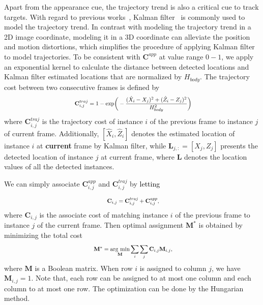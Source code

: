 \documentclass{article}
\newcommand{\argmin}{\mathop{\rm arg~min}\limits}
\newcommand{\YangProof}[1]{\textcolor{black}{#1}}
\begin{document}
Apart from the appearance cue, the trajectory trend is also a critical cue to track targets. With regard to previous works~\cite{yu2016poi, wojke2017simple}, Kalman filter~\cite{kalman1960new} is commonly used to model the trajectory trend. In contrast with modeling the trajectory trend in a 2D image coordinate, modeling it in a 3D coordinate can alleviate the position and motion distortions, which simplifies the procedure of applying Kalman filter to model trajectories. To be consistent with $\mathbf{C}^{app}$ at value range $0-1$, we apply an exponential kernel to calculate the distance between detected locations and Kalman filter estimated locations that are normalized by $H_{body}$. The trajectory cost between two consecutive frames is defined by
\begin{equation}
\label{eq:dis}
\scalebox{0.8}{
\begin{math}
\begin{split}
\mathbf{C}^{traj}_{i,j} = 1-\text{exp}\bigg( -\frac{(\hat{X}_{i}-X_{j})^{2}+(\hat{Z}_{i}-Z_{j})^{2}} {H_{body}^{2}} \bigg)
\end{split}
\end{math}}
\end{equation}
where $\mathbf{C}^{traj}_{i,j}$ is the trajectory cost of instance $i$ of the previous frame to instance $j$ of current frame. Additionally, $[\hat{X}_{i}, \hat{Z}_{i}]$ denotes the estimated location of instance $i$ at \textbf{current} frame by Kalman filter, while $\mathbf{L}_{j,:} = [X_{j}, Z_{j}]$ presents the detected location of instance $j$ at current frame, where $\mathbf{L}$ denotes the location values of all the detected instances.

We can simply associate $\mathbf{C}^{app}_{i,j}$ and $\mathbf{C}^{traj}_{i,j}$ by \YangProof{letting}

\begin{equation}
\label{eq:add}
\scalebox{0.8}{
\begin{math}
\begin{split}
\mathbf{C}_{i,j} = \mathbf{C}^{traj}_{i,j} + \mathbf{C}^{app}_{i,j},
\end{split}
\end{math}}
\end{equation}
where $\mathbf{C}_{i,j}$ is the associate cost of matching instance $i$ of the previous frame to instance $j$ of the current frame.
Then optimal assignment $\mathbf{M}^*$ is obtained by minimizing the total cost
\begin{equation}
\label{eq:hungarian}
\scalebox{0.8}{
\begin{math}
\begin{split}
\mathbf{M}^* = \argmin_{\mathbf{M}} \sum _{i}\sum _{j}\mathbf{C}_{i,j}\mathbf{M}_{i,j},
\end{split}
\end{math}}
\end{equation}
where $\mathbf{M}$ is a Boolean matrix. When row $i$ is assigned to column $j$, we have $\mathbf{M}_{i,j}=1$. Note that, each row can be assigned to at most one column and each column to at most one row. The optimization can be done by the Hungarian method.
\end{document}
